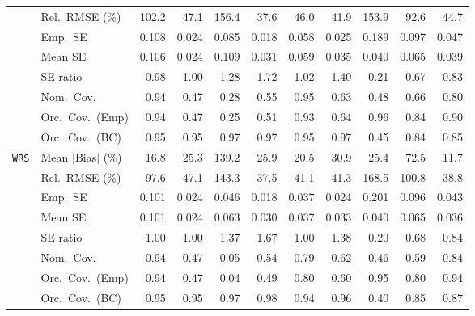 \begin{landscape}
\begin{longtable}{llrrrrrrrrr}
 & Rel.\ RMSE (\%) & 102.2 & 47.1 & 156.4 & \cellcolor{rankone}37.6 & 46.0 & \cellcolor{ranktwo}41.9 & 153.9 & 92.6 & \cellcolor{rankthree}44.7 \\
 & Emp.\ SE & 0.108 & 0.024 & 0.085 & 0.018 & 0.058 & 0.025 & 0.189 & 0.097 & 0.047 \\
 & Mean SE & 0.106 & 0.024 & 0.109 & 0.031 & 0.059 & 0.035 & 0.040 & 0.065 & 0.039 \\
 & SE ratio & \cellcolor{ranktwo}0.98 & \cellcolor{rankone}1.00 & 1.28 & 1.72 & \cellcolor{ranktwo}1.02 & 1.40 & 0.21 & 0.67 & \cellcolor{rankthree}0.83 \\
 & Nom.\ Cov. & \cellcolor{ranktwo}0.94 & 0.47 & 0.28 & 0.55 & \cellcolor{rankone}0.95 & 0.63 & 0.48 & 0.66 & \cellcolor{rankthree}0.80 \\
 & Orc.\ Cov.\ (Emp) & \cellcolor{rankone}0.94 & 0.47 & 0.25 & 0.51 & \cellcolor{ranktwo}0.93 & 0.64 & \cellcolor{rankone}0.96 & 0.84 & \cellcolor{rankthree}0.90 \\
 & Orc.\ Cov.\ (BC) & \cellcolor{rankone}0.95 & \cellcolor{ranktwo}0.95 & \cellcolor{rankthree}0.97 & \cellcolor{rankthree}0.97 & \cellcolor{rankone}0.95 & \cellcolor{rankthree}0.97 & 0.45 & 0.84 & 0.85 \\
\addlinespace[2pt]
\quad \texttt{WRS} & Mean $|$Bias$|$ (\%) & \cellcolor{ranktwo}16.8 & 25.3 & 139.2 & 25.9 & \cellcolor{rankthree}20.5 & 30.9 & 25.4 & 72.5 & \cellcolor{rankone}11.7 \\
 & Rel.\ RMSE (\%) & 97.6 & 47.1 & 143.3 & \cellcolor{rankone}37.5 & \cellcolor{rankthree}41.1 & 41.3 & 168.5 & 100.8 & \cellcolor{ranktwo}38.8 \\
 & Emp.\ SE & 0.101 & 0.024 & 0.046 & 0.018 & 0.037 & 0.024 & 0.201 & 0.096 & 0.043 \\
 & Mean SE & 0.101 & 0.024 & 0.063 & 0.030 & 0.037 & 0.033 & 0.040 & 0.065 & 0.036 \\
 & SE ratio & \cellcolor{rankone}1.00 & \cellcolor{rankone}1.00 & 1.37 & 1.67 & \cellcolor{rankone}1.00 & 1.38 & 0.20 & \cellcolor{rankthree}0.68 & \cellcolor{ranktwo}0.84 \\
 & Nom.\ Cov. & \cellcolor{rankone}0.94 & 0.47 & 0.05 & 0.54 & \cellcolor{rankthree}0.79 & 0.62 & 0.46 & 0.59 & \cellcolor{ranktwo}0.84 \\
 & Orc.\ Cov.\ (Emp) & \cellcolor{ranktwo}0.94 & 0.47 & 0.04 & 0.49 & \cellcolor{rankthree}0.80 & 0.60 & \cellcolor{rankone}0.95 & \cellcolor{rankthree}0.80 & \cellcolor{ranktwo}0.94 \\
 & Orc.\ Cov.\ (BC) & \cellcolor{rankone}0.95 & \cellcolor{ranktwo}0.95 & \cellcolor{rankthree}0.97 & 0.98 & \cellcolor{ranktwo}0.94 & \cellcolor{ranktwo}0.96 & 0.40 & 0.85 & 0.87 \\

\end{longtable}
\end{landscape}
